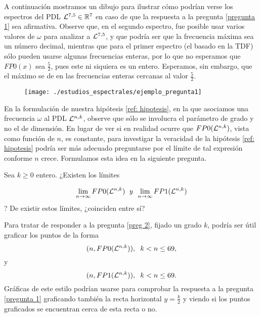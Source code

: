A continuación mostramos un dibujo para
ilustrar cómo podrían verse los
espectros del PDL
$\mathcal{L}^{7,5} \in \mathbb{R}^{7}$
en caso de que la respuesta a la pregunta
\ref{pregunta 1} sea afirmativa.
Observe que, en el segundo espectro,
fue posible usar varios valores de $\omega$ para analizar
a $\mathcal{L}^{7,5}$, y que podría ser que la frecuencia máxima
sea un número decimal, mientras que para el primer espectro
(el basado en la TDF) sólo pueden usarse algunas frecuencias
enteras, por lo que no esperamos que 
$FP0(x)$
sea $\frac{5}{2}$, pues este ni siquiera es un entero.
Esperamos, sin embargo, que el máximo se de en las frecuencias
enteras cercanas al valor $\frac{5}{2}$.

\begin{figure}[H]
	\centering
	\texttt{[image: ./estudios\_espectrales/ejemplo\_pregunta1]} 
\end{figure}	

En la formulación de nuestra hipótesis \ref{ref: hipotesis},
en la que asociamos una frecuencia $\omega$
al PDL $\mathcal{L}^{n,k}$, observe que sólo se involucra el 
parámetro de grado y no el de dimensión.
En lugar de ver si en realidad ocurre que
$FP0(\mathcal{L}^{n,k})$, vista como función 
de $n$, es constante, 
para investigar la veracidad de la hipótesis \ref{ref: hipotesis}
podría ser más adecuado preguntarse
por el límite de tal expresión conforme $n$ crece.
Formulamos esta idea en la siguiente pregunta.

\begin{pregunta}
\label{preg 2}
Sea $k \geq 0$ entero. 
¿Existen los límites

\[
\lim\limits_{n \rightarrow \infty}{FP0(\mathcal{L}^{n,k})}
\hspace{0.2cm} \textit{y} \hspace{0.2cm}
\lim\limits_{n \rightarrow \infty}{FP1(\mathcal{L}^{n,k})}
\]
?
De existir estos límites, ¿coinciden entre sí?
\end{pregunta}

Para tratar de responder a la pregunta \ref{preg 2},
fijado un grado $k$,
podría ser útil graficar los puntos de la forma
\begin{equation}
\label{eq0: 8may}
(n, FP0(\mathcal{L}^{n,k})), \hspace{0.2cm} k < n \leq 69,
\end{equation}
y 
\begin{equation}
\label{eq1: 8may}
(n, FP1(\mathcal{L}^{n,k})), \hspace{0.2cm} k < n \leq 69.
\end{equation}
Gráficas de este estilo podrían usarse para comprobar
la respuesta a la pregunta \ref{pregunta 1} 
graficando también la recta horizontal $y = \frac{k}{2}$
y viendo si los puntos graficados se encuentran cerca
de esta recta o no. 


